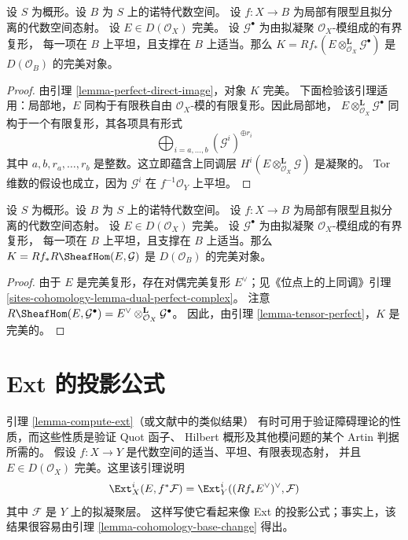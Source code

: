 \begin{lemma}
\label{lemma-tensor-perfect}
设 $S$ 为概形。设 $B$ 为 $S$ 上的诺特代数空间。
设 $f : X \to B$ 为局部有限型且拟分离的代数空间态射。
设 $E \in D(\mathcal{O}_X)$ 完美。
设 $\mathcal{G}^\bullet$ 为由拟凝聚 $\mathcal{O}_X$-模组成的有界复形，
每一项在 $B$ 上平坦，且支撑在 $B$ 上适当。那么
$K = Rf_*(E \otimes^\mathbf{L}_{\mathcal{O}_X} \mathcal{G}^\bullet)$
是 $D(\mathcal{O}_B)$ 的完美对象。
\end{lemma}

\begin{proof}
由引理 \ref{lemma-perfect-direct-image}，对象 $K$ 完美。
下面检验该引理适用：局部地，$E$ 同构于有限秩自由
$\mathcal{O}_X$-模的有限复形。因此局部地，
$E \otimes^\mathbf{L}_{\mathcal{O}_X} \mathcal{G}^\bullet$
同构于一个有限复形，其各项具有形式
$$
\bigoplus\nolimits_{i = a, \ldots, b} (\mathcal{G}^i)^{\oplus r_i}
$$
其中 $a, b, r_a, \ldots, r_b$ 是整数。这立即蕴含上同调层
$H^i(E \otimes^\mathbf{L}_{\mathcal{O}_X} \mathcal{G})$ 是凝聚的。%
Tor 维数的假设也成立，因为 $\mathcal{G}^i$ 在
$f^{-1}\mathcal{O}_Y$ 上平坦。%
\end{proof}

\begin{lemma}
\label{lemma-ext-perfect}
设 $S$ 为概形。设 $B$ 为 $S$ 上的诺特代数空间。
设 $f : X \to B$ 为局部有限型且拟分离的代数空间态射。
设 $E \in D(\mathcal{O}_X)$ 完美。
设 $\mathcal{G}^\bullet$ 为由拟凝聚 $\mathcal{O}_X$-模组成的有界复形，
每一项在 $B$ 上平坦，且支撑在 $B$ 上适当。那么
$K = Rf_*R\SheafHom(E, \mathcal{G})$ 是 %
$D(\mathcal{O}_B)$ 的完美对象。
\end{lemma}

\begin{proof}
由于 $E$ 是完美复形，存在对偶完美复形 $E^\vee$；见《位点上的上同调》引理
\ref{sites-cohomology-lemma-dual-perfect-complex}。
注意
$R\SheafHom(E, \mathcal{G}^\bullet) =
E^\vee \otimes^\mathbf{L}_{\mathcal{O}_X} \mathcal{G}^\bullet$。
因此，由引理 \ref{lemma-tensor-perfect}，$K$ 是完美的。
\end{proof}






\section{Ext 的投影公式}
\label{section-ext}

\noindent
引理 \ref{lemma-compute-ext}（或文献中的类似结果）
有时可用于验证障碍理论的性质，而这些性质是验证 Quot 函子、
Hilbert 概形及其他模问题的某个 Artin 判据所需的。
假设 $f : X \to Y$ 是代数空间的适当、平坦、有限表现态射，
并且 $E \in D(\mathcal{O}_X)$ 完美。这里该引理说明
$$
\Ext^i_X(E, f^*\mathcal{F}) =
\Ext^i_Y((Rf_*E^\vee)^\vee, \mathcal{F})
$$
其中 $\mathcal{F}$ 是 $Y$ 上的拟凝聚层。
这样写使它看起来像 Ext 的投影公式；事实上，该结果很容易由引理
\ref{lemma-cohomology-base-change} 得出。

